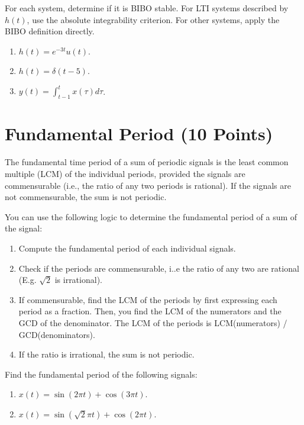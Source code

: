 \documentclass[12pt,xcolor=dvipsnames,svgnames,x11names]{article}
\begin{document}
For each system, determine if it is BIBO stable. For LTI systems described by 
$h(t)$, use the absolute integrability criterion. For other systems, apply the BIBO definition directly.

\begin{enumerate}
\item $h(t) = e^{-3t}u(t)$.
\item $h(t) = \delta
(t-5)$.
\item $y(t) = \int_{t-1}^t x(\tau)d\tau$.
\end{enumerate}


\section{Fundamental Period (10 Points)}

The fundamental time period of a sum of periodic signals is the least common multiple (LCM) of the individual periods, provided the signals are commensurable (i.e., the ratio of any two periods is rational). If the signals are not commensurable, the sum is not periodic.

You can use the following logic to determine the fundamental period of a sum of the signal:

\begin{enumerate}
\item Compute the fundamental period of each individual signals.

\item Check if the periods are commensurable, i..e the ratio of any two are rational (E.g. $\sqrt{2}$ is irrational).

\item If commensurable, find the LCM of the periods by first expressing each period as a fraction. Then, you find the LCM of the numerators and the GCD of the denominator.  The LCM of the periods is LCM(numerators) / GCD(denominators).

\item If the ratio is irrational, the sum is not periodic.
\end{enumerate}

Find the fundamental period of the following signals:

\begin{enumerate}

\item $x(t) = \sin(2\pi t) + \cos(3\pi t)$.
\item $x(t) = \sin(\sqrt{2} \pi t) + \cos(2\pi t)$.

\end{enumerate}
\end{document}
